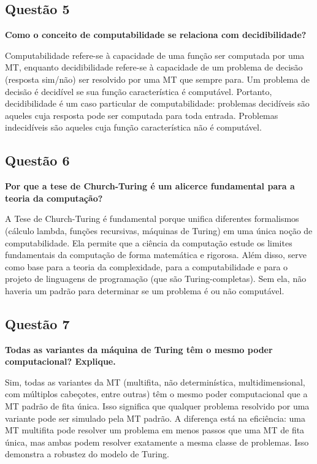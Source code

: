\documentclass[conference]{IEEEtran}
\begin{document}
\subsection{Questão 5}
\textbf{Como o conceito de computabilidade se relaciona com decidibilidade?}

Computabilidade refere-se à capacidade de uma função ser computada por uma MT, enquanto decidibilidade refere-se à capacidade de um problema de decisão (resposta sim/não) ser resolvido por uma MT que sempre para. Um problema de decisão é decidível se sua função característica é computável. Portanto, decidibilidade é um caso particular de computabilidade: problemas decidíveis são aqueles cuja resposta pode ser computada para toda entrada. Problemas indecidíveis são aqueles cuja função característica não é computável.

\subsection{Questão 6}
\textbf{Por que a tese de Church-Turing é um alicerce fundamental para a teoria da computação?}

A Tese de Church-Turing é fundamental porque unifica diferentes formalismos (cálculo lambda, funções recursivas, máquinas de Turing) em uma única noção de computabilidade. Ela permite que a ciência da computação estude os limites fundamentais da computação de forma matemática e rigorosa. Além disso, serve como base para a teoria da complexidade, para a computabilidade e para o projeto de linguagens de programação (que são Turing-completas). Sem ela, não haveria um padrão para determinar se um problema é ou não computável.

\subsection{Questão 7}
\textbf{Todas as variantes da máquina de Turing têm o mesmo poder computacional? Explique.}

Sim, todas as variantes da MT (multifita, não determinística, multidimensional, com múltiplos cabeçotes, entre outras) têm o mesmo poder computacional que a MT padrão de fita única. Isso significa que qualquer problema resolvido por uma variante pode ser simulado pela MT padrão. A diferença está na eficiência: uma MT multifita pode resolver um problema em menos passos que uma MT de fita única, mas ambas podem resolver exatamente a mesma classe de problemas. Isso demonstra a robustez do modelo de Turing.
\end{document}
